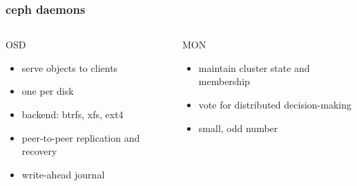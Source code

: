 \documentclass[10pt, compress]{beamer}
\begin{document}
\begin{frame}[fragile]
    \frametitle{ceph daemons}
    \begin{columns}
            \begin{block}{OSD}
                \begin{itemize}
                \item serve objects to clients
                \item one per disk
                \item backend: btrfs, xfs, ext4
                \item peer-to-peer replication and recovery
                \item write-ahead journal
            \end{itemize}
            \end{block}
            \begin{block}{MON}
                \begin{itemize}
                \item maintain cluster state and membership
                \item vote for distributed decision-making
                \item small, odd number
                \end{itemize}
                \vspace*{8mm}
            \end{block}
    \end{columns}
\end{frame}
\end{document}
